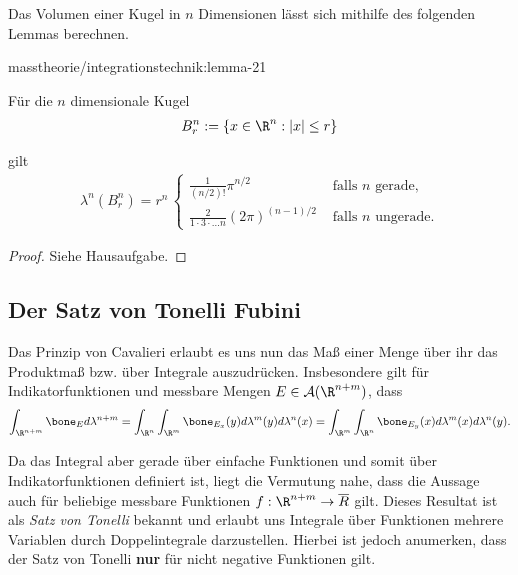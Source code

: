 \documentclass[letterpaper,10pt,german]{jupyterBook}
\begin{document}
\par
Das Volumen einer Kugel in \(n\) Dimensionen lässt sich mithilfe des folgenden Lemmas berechnen.
\begin{lemma}{}{masstheorie/integrationstechnik:lemma-21}



\par
Für die \(n\) dimensionale Kugel
\begin{align*}
B_r^n:=\{x\in\R^n: |x|\leq r\}
\end{align*}
\par
gilt
\begin{align*}
\lambda^n(B_r^n) =
r^n\,
\begin{cases}
\frac{1}{(n/2)!} \pi^{n/2}&\text{ falls }n \text{ gerade,}\\
\frac{2}{1\cdot 3\cdot\ldots n} (2\pi)^{(n-1)/2}&\text{ falls }n \text{ ungerade.}
\end{cases}
\end{align*}\end{lemma}

\begin{proof}
 Siehe Hausaufgabe.
\end{proof}


\subsection{Der Satz von Tonelli Fubini}
\label{\detokenize{masstheorie/integrationstechnik:der-satz-von-tonelli-fubini}}
\par
Das Prinzip von Cavalieri erlaubt es uns nun das Maß einer Menge über ihr das Produktmaß bzw. über Integrale auszudrücken. Insbesondere gilt für Indikatorfunktionen und messbare Mengen \(E\in\mathcal{A}(\R^{n+m})\), dass
\begin{align*}
\int_{\R^{n+m}} \bone_E d\lambda^{n+m} = \int_{\R^{n}} \int_{\R^{m}} \bone_{E_x}(y) d\lambda^m(y)d\lambda^n(x) =
\int_{\R^{m}} \int_{\R^{n}} \bone_{E_y}(x) d\lambda^m(x)d\lambda^n(y).
\end{align*}
\par
Da das Integral aber gerade über einfache Funktionen und somit über Indikatorfunktionen definiert ist, liegt die Vermutung nahe, dass die Aussage auch für beliebige messbare Funktionen \(f:\R^{n+m}\to\overline{R}\) gilt. Dieses Resultat ist als \emph{Satz von Tonelli} bekannt und erlaubt uns Integrale über Funktionen mehrere Variablen durch Doppelintegrale darzustellen. Hierbei ist jedoch anumerken, dass der Satz von Tonelli \textbf{nur} für nicht negative Funktionen gilt.
\end{document}
